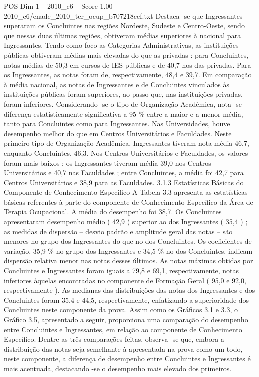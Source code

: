 \begin{textsample}{POS Dim 1 – 2010\_c6 – Score 1.00 – 2010\_c6/enade\_2010\_ter\_ocup\_b707218cef.txt}
Destaca -se que Ingressantes superaram os Concluintes nas regiões Nordeste, Sudeste e Centro-Oeste, sendo que nessas duas últimas regiões, obtiveram médias superiores à nacional para Ingressantes.
Tendo como foco as Categorias Administrativas, as instituições públicas obtiveram médias mais elevadas do que as privadas : para Concluintes, notas médias de 50,3 em cursos de IES públicas e de 40,7 nos das privadas.
Para os Ingressantes, as notas foram de, respectivamente, 48,4 e 39,7.
Em comparação à média nacional, as notas de Ingressantes e de Concluintes vinculados às instituições públicas foram superiores, ao passo que, nas instituições privadas, foram inferiores.
Considerando -se o tipo de Organização Acadêmica, nota -se diferença estatisticamente significativa a 95 \% entre a maior e a menor média, tanto para Concluintes como para Ingressantes.
Nas Universidades, houve desempenho melhor do que em Centros Universitários e Faculdades.
Neste primeiro tipo de Organização Acadêmica, Ingressantes tiveram nota média 46,7, enquanto Concluintes, 46,3.
Nos Centros Universitários e Faculdades, os valores foram mais baixos : os Ingressantes tiveram média 39,0 nos Centros Universitários e 40,7 nas Faculdades ; entre Concluintes, a média foi 42,7 para Centros Universitários e 38,9 para as Faculdades. 3.1.3 Estatísticas Básicas do Componente de Conhecimento Específico A Tabela 3.3 apresenta as estatísticas básicas referentes à parte do componente de Conhecimento Específico da Área de Terapia Ocupacional.
A média do desempenho foi 38,7.
Os Concluintes apresentaram desempenho médio ( 42,9 ) superior ao dos Ingressantes ( 35,4 ) ; as medidas de dispersão – desvio padrão e amplitude geral das notas – são menores no grupo dos Ingressantes do que no dos Concluintes.
Os coeficientes de variação, 35,9 \% no grupo dos Ingressantes e 34,5 \% no dos Concluintes, indicam dispersão relativa menor nas notas desses últimos.
As notas máximas obtidas por Concluintes e Ingressantes foram iguais a 79,8 e 69,1, respectivamente, notas inferiores àquelas encontradas no componente de Formação Geral ( 95,0 e 92,0, respectivamente ).
As medianas das distribuições das notas dos Ingressantes e dos Concluintes foram 35,4 e 44,5, respectivamente, enfatizando a superioridade dos Concluintes neste componente da prova.
Assim como os Gráficos 3.1 e 3.3, o Gráfico 3.5, apresentado a seguir, proporciona uma comparação do desempenho entre Concluintes e Ingressantes, em relação ao componente de Conhecimento Específico.
Dentre as três comparações feitas, observa -se que, embora a distribuição das notas seja semelhante à apresentada na prova como um todo, neste componente, a diferença de desempenho entre Concluintes e Ingressantes é mais acentuada, destacando -se o desempenho mais elevado dos primeiros.

\end{textsample}
